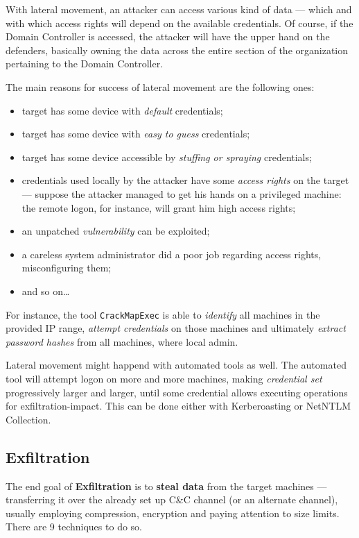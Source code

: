 \documentclass[10pt]{extreport}
\begin{document}
With lateral movement, an attacker can access various kind of data --- which and
with which access rights will depend on the available credentials. Of course,
if the Domain Controller is accessed, the attacker will have the upper hand on
the defenders, basically owning the data across the entire section of the organization pertaining to the Domain Controller.

The main reasons for success of lateral movement are the following ones:
\begin{itemize}
    \item target has some device with \emph{default} credentials;
    \item target has some device with \emph{easy to guess} credentials;
    \item target has some device accessible by \emph{stuffing or spraying} credentials;
    \item credentials used locally by the attacker have some \emph{access
        rights} on the target --- suppose the attacker managed to get his hands
        on a privileged machine: the remote logon, for instance, will grant him
        high access rights;
    \item an unpatched \emph{vulnerability} can be exploited;
    \item a careless system administrator did a poor job regarding access
        rights, misconfiguring them;
    \item and so on\dots
\end{itemize}

For instance, the tool \texttt{CrackMapExec} is able to \emph{identify} all
machines in the provided IP range, \emph{attempt credentials} on those machines
and ultimately \emph{extract password hashes} from all machines, where local
admin.

Lateral movement might happend with automated tools as well. The automated tool
will attempt logon on more and more machines, making \emph{credential set}
progressively larger and larger, until some credential allows executing
operations for exfiltration\--impact. This can be done either with
Kerberoasting or NetNTLM Collection.


\subsection{Exfiltration}

The end goal of \textbf{Exfiltration} is to \textbf{steal data} from the target
machines --- transferring it over the already set up C\&C channel (or an
alternate channel), usually employing compression, encryption and paying
attention to size limits. There are 9 techniques to do so.
\end{document}
